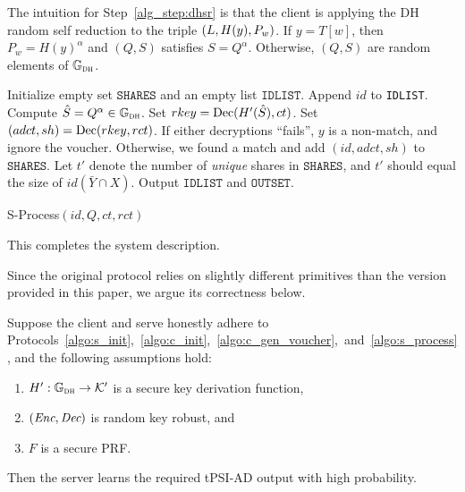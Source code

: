 The intuition for Step~\ref{alg_step:dhsr} is that the client is applying the DH random self reduction to the triple $\left(L, H(y), P_w\right)$. If $y = T[w]$, then $P_w = H(y)^\alpha$ and $(Q,S)$ satisfies $S = Q^\alpha$. Otherwise, $(Q,S)$ are random elements of $\mathbb{G}_{\textsc{dh}}$.


\begin{algorithm}[H]
\DontPrintSemicolon
Initialize empty set $\texttt{{SHARES}}$ and an empty list $\texttt{IDLIST}$.\;
    Append $id$ to \texttt{IDLIST}.\;
    Compute $\hat{S} = Q^{\alpha} \in \mathbb{G}_{\textsc{dh}}$.\;
    Set $rkey = \text{Dec} (H'(\hat{S}), ct)$.\;
    Set $(adct, sh) = \text{Dec} (rkey, rct)$.\;
    If either decryptions ``fails'', $y$ is a non-match, and ignore the voucher. \;
    Otherwise, we found a match and add $(id, adct, sh)$ to $\texttt{SHARES}$.\;
Let $t'$ denote the number of \emph{unique} shares in $\texttt{SHARES}$, and $t'$ should equal the size of $id (\bar{Y} \cap X)$. \; 
Output $\texttt{IDLIST}$ and $\texttt{OUTSET}$.\; 
\caption{{\sf S-Process}$(id, Q, ct, rct)$} 
\label{algo:s_process}
\end{algorithm}
\noindent
This completes the system description.

Since the original protocol relies on slightly different primitives than the version provided in this paper, we argue its correctness below.
\begin{theorem}[Correctness]
Suppose the client and serve honestly adhere to Protocols~\ref{algo:s_init},~\ref{algo:c_init},~\ref{algo:c_gen_voucher},~and~\ref{algo:s_process}, and the following assumptions hold:
\begin{enumerate}[label=(\roman*)]
    \item  $H' : \mathbb{G}_{\textsc{dh}} \to \mathcal{K}'$ is a secure key derivation function,
    \item $(\emph{\text{Enc}}, \emph{\text{Dec}})$ is random key robust, and
    \item $F$ is a secure PRF.
\end{enumerate}
Then the server learns the required tPSI-AD output with high probability.
\end{theorem}

